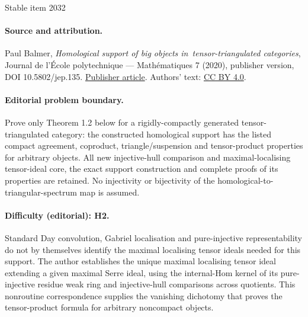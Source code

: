 \documentclass[11pt]{article}
\begin{document}
\begin{center}{\Large Stable item 2032}\end{center}
\paragraph{Source and attribution.}
Paul Balmer, \emph{Homological support of big objects in tensor-triangulated categories}, Journal de l’École polytechnique — Mathématiques 7 (2020), publisher version, DOI 10.5802/jep.135. \href{https://jep.centre-mersenne.org/articles/10.5802/jep.135/}{Publisher article}. Authors' text: \href{https://creativecommons.org/licenses/by/4.0/}{CC BY 4.0}.
\paragraph{Editorial problem boundary.}
Prove only Theorem 1.2 below for a rigidly-compactly generated tensor-triangulated category: the constructed homological support has the listed compact agreement, coproduct, triangle/suspension and tensor-product properties for arbitrary objects. All new injective-hull comparison and maximal-localising tensor-ideal core, the exact support construction and complete proofs of its properties are retained. No injectivity or bijectivity of the homological-to-triangular-spectrum map is assumed.
\paragraph{Difficulty (editorial): H2.}
Standard Day convolution, Gabriel localisation and pure-injective representability do not by themselves identify the maximal localising tensor ideals needed for this support. The author establishes the unique maximal localising tensor ideal extending a given maximal Serre ideal, using the internal-Hom kernel of its pure-injective residue weak ring and injective-hull comparisons across quotients. This nonroutine correspondence supplies the vanishing dichotomy that proves the tensor-product formula for arbitrary noncompact objects.
\end{document}

